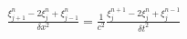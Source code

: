 \documentclass[preview]{standalone}
\begin{document}
\begin{align*}
\frac{\xi_{j+1}^{n} - 2 \xi_{j}^{n} + \xi_{j-1}^{n}}{\delta x^2} = \frac{1}{c^2}\frac{\xi_{j}^{n+1} - 2 \xi_{j}^{n} + \xi_{j}^{n-1}}{\delta t^2}
\end{align*}
\end{document}
